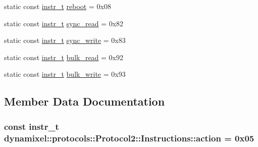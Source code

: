 \begin{DoxyCompactItemize}
\item 
static const \hyperlink{classdynamixel_1_1protocols_1_1_protocol2_aa7302f20356607bd51e4d4ecf4cb7abf}{instr\+\_\+t} \hyperlink{structdynamixel_1_1protocols_1_1_protocol2_1_1_instructions_adea65ed9e07cae36e62cc0fabaf2e684}{reboot} = 0x08
\item 
static const \hyperlink{classdynamixel_1_1protocols_1_1_protocol2_aa7302f20356607bd51e4d4ecf4cb7abf}{instr\+\_\+t} \hyperlink{structdynamixel_1_1protocols_1_1_protocol2_1_1_instructions_aba6babc271a5d2b8fc21a88ac77573dd}{sync\+\_\+read} = 0x82
\item 
static const \hyperlink{classdynamixel_1_1protocols_1_1_protocol2_aa7302f20356607bd51e4d4ecf4cb7abf}{instr\+\_\+t} \hyperlink{structdynamixel_1_1protocols_1_1_protocol2_1_1_instructions_a4187ed3c1dbf41b31155b02c98516d7d}{sync\+\_\+write} = 0x83
\item 
static const \hyperlink{classdynamixel_1_1protocols_1_1_protocol2_aa7302f20356607bd51e4d4ecf4cb7abf}{instr\+\_\+t} \hyperlink{structdynamixel_1_1protocols_1_1_protocol2_1_1_instructions_ac25d5d672f7b6e14d21bf6292c3822fa}{bulk\+\_\+read} = 0x92
\item 
static const \hyperlink{classdynamixel_1_1protocols_1_1_protocol2_aa7302f20356607bd51e4d4ecf4cb7abf}{instr\+\_\+t} \hyperlink{structdynamixel_1_1protocols_1_1_protocol2_1_1_instructions_a0d01472800d0b0bf7531dd0396db3838}{bulk\+\_\+write} = 0x93
\end{DoxyCompactItemize}


\subsection{Member Data Documentation}
\subsubsection[{\texorpdfstring{action}{action}}]{\setlength{\rightskip}{0pt plus 5cm}const {\bf instr\+\_\+t} dynamixel\+::protocols\+::\+Protocol2\+::\+Instructions\+::action = 0x05\hspace{0.3cm}{\ttfamily [static]}}\hypertarget{structdynamixel_1_1protocols_1_1_protocol2_1_1_instructions_a1f15f30aea4c4e316d5ba15eddcaf49b}{}\label{structdynamixel_1_1protocols_1_1_protocol2_1_1_instructions_a1f15f30aea4c4e316d5ba15eddcaf49b}

